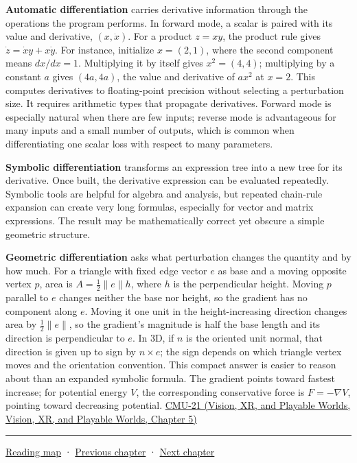 \textbf{Automatic differentiation} carries derivative information through the operations the program performs. In forward mode, a scalar is paired with its value and derivative, \((x,\dot x)\). For a product \(z=xy\), the product rule gives \(\dot z=\dot x y+x\dot y\). For instance, initialize \(x=(2,1)\), where the second component means \(dx/dx=1\). Multiplying it by itself gives \(x^2=(4,4)\); multiplying by a constant \(a\) gives \((4a,4a)\), the value and derivative of \(ax^2\) at \(x=2\). This computes derivatives to floating-point precision without selecting a perturbation size. It requires arithmetic types that propagate derivatives. Forward mode is especially natural when there are few inputs; reverse mode is advantageous for many inputs and a small number of outputs, which is common when differentiating one scalar loss with respect to many parameters.

\textbf{Symbolic differentiation} transforms an expression tree into a new tree for its derivative. Once built, the derivative expression can be evaluated repeatedly. Symbolic tools are helpful for algebra and analysis, but repeated chain-rule expansion can create very long formulas, especially for vector and matrix expressions. The result may be mathematically correct yet obscure a simple geometric structure.

\textbf{Geometric differentiation} asks what perturbation changes the quantity and by how much. For a triangle with fixed edge vector \(e\) as base and a moving opposite vertex \(p\), area is \(A=\tfrac12\|e\|h\), where \(h\) is the perpendicular height. Moving \(p\) parallel to \(e\) changes neither the base nor height, so the gradient has no component along \(e\). Moving it one unit in the height-increasing direction changes area by \(\tfrac12\|e\|\), so the gradient's magnitude is half the base length and its direction is perpendicular to \(e\). In 3D, if \(n\) is the oriented unit normal, that direction is given up to sign by \(n\times e\); the sign depends on which triangle vertex moves and the orientation convention. This compact answer is easier to reason about than an expanded symbolic formula. The gradient points toward fastest increase; for potential energy \(V\), the corresponding conservative force is \(F=-\nabla V\), pointing toward decreasing potential. \href{../07-Vision-XR-and-Playable-Worlds/main.pdf\#nameddest=04-visual-computing-ii-ch036-cmu-21---dynamics-and-time-integration}{CMU-21 (Vision, XR, and Playable Worlds, Vision, XR, and Playable Worlds, Chapter 5)}

\begin{center}\rule{0.5\linewidth}{0.5pt}\end{center}

\hyperref[volume-reading-map]{Reading map} · \hyperref[04-visual-computing-ii-ch028-visibility-queries-and-ray-intersections]{Previous chapter} · \hyperref[04-visual-computing-ii-ch030-mesh-operators-boundaries-and-diffusion]{Next chapter}

